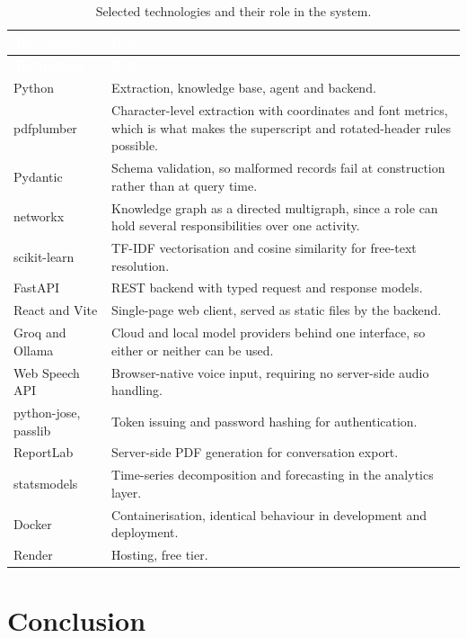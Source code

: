 \begin{longtable}{|p{}|p{}|}
\caption{Selected technologies and their role in the system.}\label{tab:tech}\\
\hline
\rowcolor{myblue}\textcolor{white}{\textbf{Technology}} & \textcolor{white}{\textbf{Role}} \\
\hline
\endfirsthead
\hline
\rowcolor{myblue}\textcolor{white}{\textbf{Technology}} & \textcolor{white}{\textbf{Role}} \\
\hline
\endhead
Python & Extraction, knowledge base, agent and backend. \\ \hline
pdfplumber & Character-level extraction with coordinates and font metrics, which is what makes the superscript and rotated-header rules possible. \\ \hline
Pydantic & Schema validation, so malformed records fail at construction rather than at query time. \\ \hline
networkx & Knowledge graph as a directed multigraph, since a role can hold several responsibilities over one activity. \\ \hline
scikit-learn & TF-IDF vectorisation and cosine similarity for free-text resolution. \\ \hline
FastAPI & REST backend with typed request and response models. \\ \hline
React and Vite & Single-page web client, served as static files by the backend. \\ \hline
Groq and Ollama & Cloud and local model providers behind one interface, so either or neither can be used. \\ \hline
Web Speech API & Browser-native voice input, requiring no server-side audio handling. \\ \hline
python-jose, passlib & Token issuing and password hashing for authentication. \\ \hline
ReportLab & Server-side PDF generation for conversation export. \\ \hline
statsmodels & Time-series decomposition and forecasting in the analytics layer. \\ \hline
Docker & Containerisation, identical behaviour in development and deployment. \\ \hline
Render & Hosting, free tier. \\ \hline
\end{longtable}

\section*{Conclusion}

